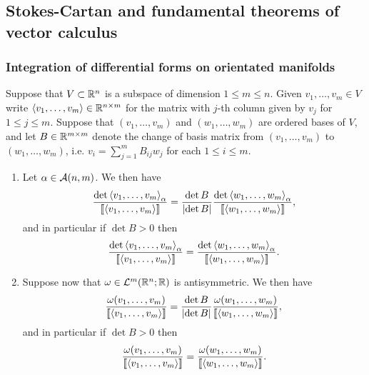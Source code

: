 \documentclass[a4paper]{article}
\begin{document}
\subsection{Stokes-Cartan and fundamental theorems
of vector calculus}

\subsubsection{Integration of differential forms on 
orientated manifolds}

\begin{lemma}
  Suppose that $V \subset \mathbb{R}^n$ is a subspace of dimension
  $1\leq m \leq n$. Given $v_1,\dots,v_m \in V$ write
  $\left\langle v_1,\dots,v_m \right\rangle \in \mathbb{R}^{n \times m}$ for the matrix
  with $j$-th column given by $v_j$ for $1 \leq j \leq m$.
  Suppose that $(v_1,\dots,v_m)$ and $(w_1,\dots,w_m)$ are
  ordered bases of $V$, and let $B \in \mathbb{R}^{m \times m}$ denote
  the change of basis matrix from $(v_1,\dots,v_m)$ to
  $(w_1,\dots,w_m)$, i.e. $v_i = \sum_{j=1}^m B_{ij} w_j$
  for each $1 \leq i \leq m$.
  
  
  
  \begin{enumerate}
  \item Let $\alpha \in \mathcal{A}(n,m)$. We then have 
  \[
  \frac{\det \left\langle v_1,\dots,v_m \right\rangle_\alpha }
  {\left\llbracket \left\langle v_1,\dots,v_m \right\rangle \right\rrbracket }
  = \frac{\det B}{\left\lvert \det B\right\rvert}
  \frac{\det \left\langle w_1,\dots,w_m \right\rangle_\alpha }
  {\left\llbracket \left\langle w_1,\dots,w_m \right\rangle \right\rrbracket },
  \]
  and in particular if $\det B >0$ then
  \[
  \frac{\det \left\langle v_1,\dots,v_m \right\rangle_\alpha }
  {\left\llbracket \left\langle v_1,\dots,v_m \right\rangle \right\rrbracket }
  = \frac{\det \left\langle w_1,\dots,w_m \right\rangle_\alpha }
  {\left\llbracket \left\langle w_1,\dots,w_m \right\rangle \right\rrbracket }.
  \]
  
  
  \item Suppose now that $\omega \in \mathcal{L}^m(\mathbb{R}^n;\mathbb{R})$ is
  antisymmetric. We then have
  \[
  \frac{\omega(v_1,\dots,v_m)}{\left\llbracket \left\langle v_1,\dots,v_m \right\rangle \right\rrbracket }
  = \frac{\det B}{\left\lvert \det B\right\rvert} \frac{\omega(w_1,\dots,w_m)}
  {\left\llbracket \left\langle w_1,\dots,w_m \right\rangle \right\rrbracket},
  \]
  and in particular if $\det B > 0$ then
  \[
  \frac{\omega(v_1,\dots,v_m)}{\left\llbracket \left\langle v_1,\dots,v_m \right\rangle \right\rrbracket}
  = \frac{\omega(w_1,\dots,w_m)}{\left\llbracket \left\langle w_1,\dots,w_m \right\rangle \right\rrbracket}.
  \]
  \end{enumerate}
\end{lemma}
\end{document}
